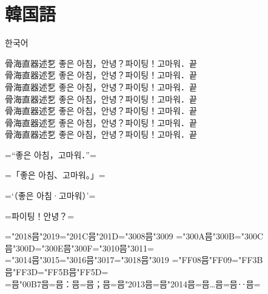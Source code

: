 \documentclass[landscape]{utarticle}
\begin{document}
\section{韓国語}
\upkorgtb 한국어

\upkorrml 骨海直器述乭 좋은 아침，안녕？파이팅！고마워．끝\\
\upkorrmm 骨海直器述乭 좋은 아침，안녕？파이팅！고마워．끝\\
\upkorrmb 骨海直器述乭 좋은 아침，안녕？파이팅！고마워．끝\\
\upkorgtm 骨海直器述乭 좋은 아침，안녕？파이팅！고마워．끝\\
\upkorgtb 骨海直器述乭 좋은 아침，안녕？파이팅！고마워．끝\\
\upkorgte 骨海直器述乭 좋은 아침，안녕？파이팅！고마워．끝\\
\upkorgth 骨海直器述乭 좋은 아침，안녕？파이팅！고마워．끝\\

\upkorrmm

=“좋은 아침，고마워．”=

=「좋은 아침、고마워。」=

=‘（좋은 아침·고마워）’=

=파이팅！안녕？=

=\kchar"2018믐\kchar"2019=\kchar"201C믐\kchar"201D=\kchar"3008믐\kchar"3009%
=\kchar"300A믐\kchar"300B=\kchar"300C믐\kchar"300D=\kchar"300E믐\kchar"300F=\kchar"3010믐\kchar"3011=\\
=\kchar"3014믐\kchar"3015=\kchar"3016믐\kchar"3017=\kchar"3018믐\kchar"3019%
=\kchar"FF08믐\kchar"FF09=\kchar"FF3B믐\kchar"FF3D=\kchar"FF5B믐\kchar"FF5D=\\
=믐\kchar"00B7믐=믐：믐=믐；믐=믐\kchar"2013믐=믐\kchar"2014믐=믐…믐=믐‥믐=
\end{document}
